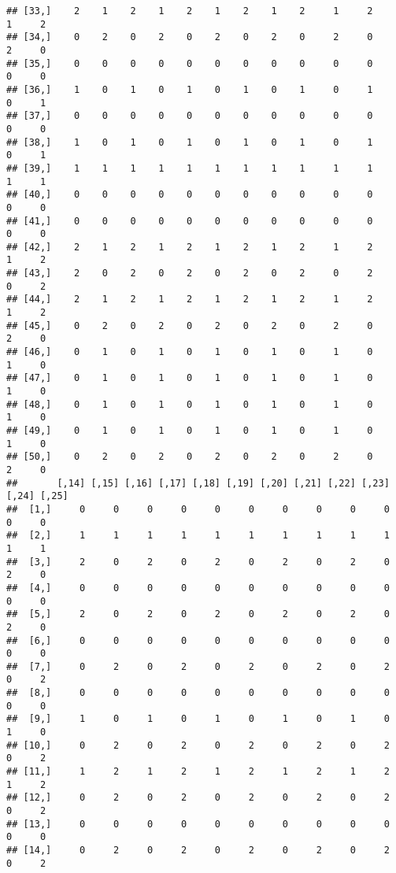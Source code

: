 \documentclass[
]{article}
\begin{document}
\begin{verbatim}
## [33,]    2    1    2    1    2    1    2    1    2     1     2     1     2
## [34,]    0    2    0    2    0    2    0    2    0     2     0     2     0
## [35,]    0    0    0    0    0    0    0    0    0     0     0     0     0
## [36,]    1    0    1    0    1    0    1    0    1     0     1     0     1
## [37,]    0    0    0    0    0    0    0    0    0     0     0     0     0
## [38,]    1    0    1    0    1    0    1    0    1     0     1     0     1
## [39,]    1    1    1    1    1    1    1    1    1     1     1     1     1
## [40,]    0    0    0    0    0    0    0    0    0     0     0     0     0
## [41,]    0    0    0    0    0    0    0    0    0     0     0     0     0
## [42,]    2    1    2    1    2    1    2    1    2     1     2     1     2
## [43,]    2    0    2    0    2    0    2    0    2     0     2     0     2
## [44,]    2    1    2    1    2    1    2    1    2     1     2     1     2
## [45,]    0    2    0    2    0    2    0    2    0     2     0     2     0
## [46,]    0    1    0    1    0    1    0    1    0     1     0     1     0
## [47,]    0    1    0    1    0    1    0    1    0     1     0     1     0
## [48,]    0    1    0    1    0    1    0    1    0     1     0     1     0
## [49,]    0    1    0    1    0    1    0    1    0     1     0     1     0
## [50,]    0    2    0    2    0    2    0    2    0     2     0     2     0
##       [,14] [,15] [,16] [,17] [,18] [,19] [,20] [,21] [,22] [,23] [,24] [,25]
##  [1,]     0     0     0     0     0     0     0     0     0     0     0     0
##  [2,]     1     1     1     1     1     1     1     1     1     1     1     1
##  [3,]     2     0     2     0     2     0     2     0     2     0     2     0
##  [4,]     0     0     0     0     0     0     0     0     0     0     0     0
##  [5,]     2     0     2     0     2     0     2     0     2     0     2     0
##  [6,]     0     0     0     0     0     0     0     0     0     0     0     0
##  [7,]     0     2     0     2     0     2     0     2     0     2     0     2
##  [8,]     0     0     0     0     0     0     0     0     0     0     0     0
##  [9,]     1     0     1     0     1     0     1     0     1     0     1     0
## [10,]     0     2     0     2     0     2     0     2     0     2     0     2
## [11,]     1     2     1     2     1     2     1     2     1     2     1     2
## [12,]     0     2     0     2     0     2     0     2     0     2     0     2
## [13,]     0     0     0     0     0     0     0     0     0     0     0     0
## [14,]     0     2     0     2     0     2     0     2     0     2     0     2

\end{verbatim}
\end{document}
